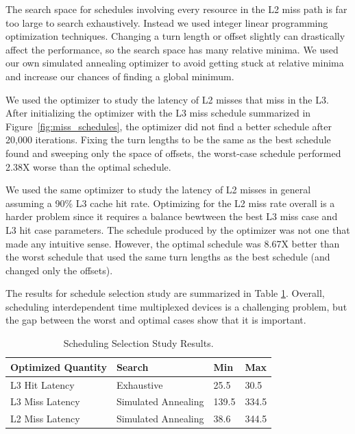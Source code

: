 The search space for schedules involving every resource in the L2 miss path
is far too large to search exhaustively.
Instead we used integer linear programming optimization techniques. Changing a 
turn length or offset slightly can drastically affect the performance, so the 
search space has many relative minima. We used our own simulated annealing 
optimizer to avoid getting stuck at relative minima and increase our chances of 
finding a global minimum.

We used the optimizer to study the latency of L2 misses that miss in the L3.
After initializing the optimizer with the L3 miss schedule summarized in 
Figure~\ref{fig:miss_schedules}, the optimizer did not find a better schedule 
after 20,000 iterations. Fixing the turn lengths to be the same as the best 
schedule found and sweeping only the space of offsets,
the worst-case schedule performed 2.38X
worse than the optimal schedule.

We used the same optimizer to study the latency of L2 misses in general 
assuming a 90\% L3 cache hit rate.
Optimizing for the L2 miss rate overall is a harder problem since it requires a 
balance bewtween the best L3 miss case and L3 hit case parameters. The schedule 
produced by the optimizer was not one that made any intuitive sense.  However, 
the optimal schedule was 8.67X better than the worst schedule that used the 
same turn lengths as the best schedule (and changed only the offsets).

The results for schedule selection study are summarized in Table 
\ref{tab:coord_results}. Overall, scheduling interdependent time multiplexed 
devices is a challenging problem, but the gap between the worst and optimal 
cases show that it is important.

\begin{table}
    \caption{Scheduling Selection Study Results.}
    \centering
    \begin{tabular}{|l|l|l|l|}
        \hline
        \multicolumn{1}{|l|}{Optimized Quantity} & Search & Min & Max \\\hline
        \multicolumn{1}{|l|}{L3 Hit Latency} & Exhaustive & 25.5 & 30.5 
        \\\hline
        \multicolumn{1}{|l|}{L3 Miss Latency} & Simulated Annealing& 139.5 & 
        334.5 \\\hline
        \multicolumn{1}{|l|}{L2 Miss Latency} & Simulated Annealing& 38.6 & 
        344.5 \\\hline
    \end{tabular}
    \label{tab:coord_results}
\end{table}

